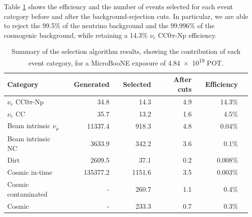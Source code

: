 Table \ref{tab:effafter} shows the efficiency and the number of events selected for each event category before and after the background-rejection cuts. In particular, we are able to reject the 99.5\% of the neutrino background and the 
99.996\% of the cosmogenic background, while retaining a 14.3\% $\nu_{e}$ CC0$\pi$-Np efficiency.

\begin{table}[htbp]
   \centering
   \begin{tabular}{llrrrrrrrr}
     \toprule
     Category & \phantom{a} & Generated & \phantom{a} & Selected & \phantom{a} & After cuts & \phantom{a} & Efficiency\\
     \midrule

     $\nu_{e}$ CC0$\pi$-Np       & & 34.8     & & 14.3   & & 4.9   & & 14.3\%\\
     $\nu_{e}$ CC                & & 35.7     & & 13.2   & & 1.6   & & 4.5\%\\
     Beam intrinsic $\nu_{\mu}$  & & 11337.4  & & 918.3  & & 4.8   & & 0.04\%\\
     Beam intrinsic NC           & & 3633.9   & & 342.2  & & 3.6   & & 0.1\%\\
     Dirt                        & & 2609.5   & & 37.1   & & 0.2   & & 0.008\%\\
     Cosmic in-time              & & 135377.2 & & 1151.6 & & 3.5   & & 0.003\%\\
     Cosmic contaminated         & & -        & & 260.7  & & 1.1   & & 0.4\%\\
     Cosmic                      & & -        & & 233.3  & & 0.7   & & 0.3\%\\

     \bottomrule
   \end{tabular}
   \caption{Summary of the selection algorithm results, showing the contribution of each event category, for a MicroBooNE exposure of \num{4.84e19} POT.}\label{tab:effafter}
\end{table}

